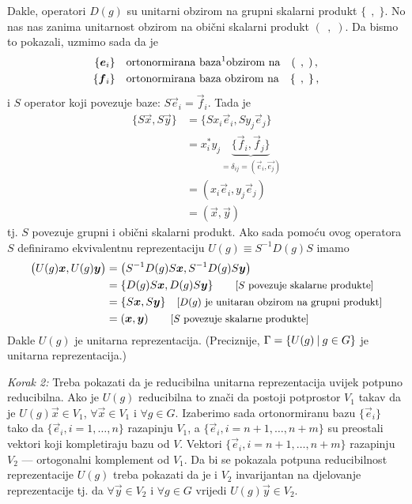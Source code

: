 Dakle, operatori $D(g)$ su unitarni obzirom na grupni skalarni produkt
$\{\;\,,\;\}$. No nas nas zanima unitarnost obzirom na obični
skalarni produkt $(\;\,,\;)$.
Da bismo to pokazali, uzmimo sada da je
\begin{align*}
\{\vec{e}_i\} \quad &\text{ortonormirana baza\footnotemark obzirom na} \quad (\;\,,\;) \,, \\
\{\vec{f}_i\} \quad &\text{ortonormirana baza obzirom na} \quad \{\;\,,\;\} \,,
\end{align*}
i $S$ operator koji povezuje baze: $S\vec{e}_i = \vec{f}_i$. Tada je
\begin{equation*}
\begin{split}
\{ S \vec{x}, S \vec{y}\} &= \{ S x_i \vec{e}_i, S y_j \vec{e}_j \} \\
&= x_{i}^* y_{j}\underbrace{ \{\vec{f}_i, \vec{f}_j\}}_{=\delta_{ij} =
 (\vec{e}_i, \vec{e_j})} \\
&= (x_i \vec{e}_i, y_j \vec{e}_j) \\
&= (\vec{x}, \vec{y})
\end{split}
\end{equation*}
tj. $S$ povezuje grupni i obični skalarni produkt. Ako sada pomoću
ovog operatora $S$ definiramo
ekvivalentnu reprezentaciju $U(g)\equiv S^{-1}D(g)S$ imamo
\begin{equation*}
\begin{split}
\big( U(g)\vec{x}, U(g)\vec{y}\big) &=
\big( S^{-1}D(g)S \vec{x}, S^{-1}D(g)S \vec{y}\big) \\
&= \{ D(g) S \vec{x}, D(g) S \vec{y} \} 
 \qquad \text{\small[$S$ povezuje skalarne produkte]}\\
&= \{ S \vec{x}, S \vec{y} \} \quad
\text{\small[$D(g)$ je unitaran obzirom na grupni produkt]}\\
&= (\vec{x}, \vec{y}) \qquad \text{\small[$S$ povezuje skalarne produkte]}
\end{split}
\end{equation*}
Dakle $U(g)$ je unitarna reprezentacija. (Preciznije, $\Gamma = \{U(g) \: | \: g\in G\}$
je unitarna reprezentacija.)

\emph{Korak 2:} Treba pokazati da je reducibilna unitarna reprezentacija
uvijek potpuno reducibilna. Ako je $U(g)$ reducibilna to znači da postoji
potprostor $V_1$ takav da je  $U(g) \vec{x} \in V_1$,
$\forall\vec{x} \in V_1$ i $\forall g\in G$.
Izaberimo sada ortonormiranu bazu $\{\vec{e}_i\}$ tako da 
$\{\vec{e}_i, i=1,\ldots, n\}$ razapinju $V_1$, a
$\{\vec{e}_i, i=n+1,\ldots, n+m \}$ su preostali vektori koji kompletiraju
bazu od $V$. Vektori $\{\vec{e}_i, i=n+1,\ldots, n+m \}$ razapinju $V_2$ ---
ortogonalni komplement od $V_1$. 
Da bi se pokazala potpuna reducibilnost
reprezentacije $U(g)$ treba pokazati da  je i $V_2$ invarijantan na djelovanje
reprezentacije tj. da 
$\forall\vec{y} \in V_2$ i $\forall g \in G$ vrijedi $U(g) \vec{y} \in V_2$.

